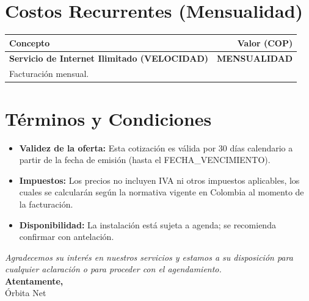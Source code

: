 \documentclass[11pt, a4paper]{article}
\begin{document}
\vspace{1cm}

\section*{Costos Recurrentes (Mensualidad)}
\begin{tabular}{p{} r}
    \toprule
    \textbf{Concepto} & \textbf{Valor (COP)} \\
    \midrule
    \textbf{Servicio de Internet Ilimitado ({{VELOCIDAD}})} & \textbf{{{MENSUALIDAD}}} \\
    \small{Facturación mensual.} & \\
    \bottomrule
\end{tabular}

\vspace{1cm}

\section*{Términos y Condiciones}
\begin{itemize}
    \item \textbf{Validez de la oferta:} Esta cotización es válida por 30 días calendario a partir de la fecha de emisión (hasta el {{FECHA_VENCIMIENTO}}).
    \item \textbf{Impuestos:} Los precios no incluyen IVA ni otros impuestos aplicables, los cuales se calcularán según la normativa vigente en Colombia al momento de la facturación.
    \item \textbf{Disponibilidad:} La instalación está sujeta a agenda; se recomienda confirmar con antelación.
\end{itemize}

\vspace{1.5cm}

\begin{center}
    \textit{Agradecemos su interés en nuestros servicios y estamos a su disposición para cualquier aclaración o para proceder con el agendamiento.}\\
    \vspace{1cm}
    \textbf{Atentamente,}\\
    \vspace{0.5cm}
    Órbita Net
\end{center}
\end{document}

